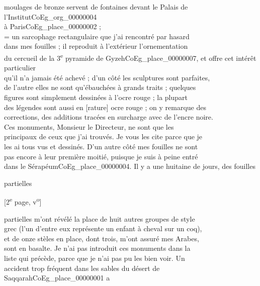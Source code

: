 \documentclass{book}
\begin{document}
moulages de bronze servent de fontaines devant le Palais de l’Institut\gls{CoEg_org_00000004}\\
à Paris\gls{CoEg_place_00000002} ;\\
 = un sarcophage rectangulaire que j’ai rencontré par hasard\\
dans mes fouilles ; il reproduit à l’extérieur l’ornementation\\
du cercueil de la 3\textsuperscript{e} pyramide de Gyzeh\gls{CoEg_place_00000007}, et offre cet intérêt particulier\\
qu’il n’a jamais été achevé ; d’un côté les sculptures sont parfaites,\\
de l’autre elles ne sont qu’ébauchées à grands traits ; quelques\\
figures sont simplement dessinées à l’ocre rouge ; la plupart\\
des légendes sont aussi en [rature] ocre rouge ; on y remarque des\\
corrections, des additions tracées en surcharge avec de l’encre noire.\\
\indent Ces monuments, Monsieur le Directeur, ne sont que les\\
principaux de ceux que j’ai trouvés. Je vous les cite parce que je\\
les ai tous vus et dessinés. D’un autre côté mes fouilles ne sont\\
pas encore à leur première moitié, puisque je suis à peine entré\\
dans le Sérapéum\gls{CoEg_place_00000004}. Il y a une huitaine de jours, des fouilles
\begin{flushright}partielles\end{flushright}
{\footnotesize \begin{center} [2\textsuperscript{e} page, v\textsuperscript{o}]\end{center}}
\noindent partielles m’ont révélé la place de huit autres groupes de style\\
grec (l’un d’entre eux représente un enfant à cheval sur un coq),\\
et de onze stèles en place, dont trois, m’ont assuré mes Arabes,\\
sont en basalte. Je n’ai pas introduit ces monuments dans la\\
liste qui précède, parce que je n’ai pas pu les bien voir. Un\\
accident trop fréquent dans les sables du désert de Saqqarah\gls{CoEg_place_00000001} a\\
\end{document}
